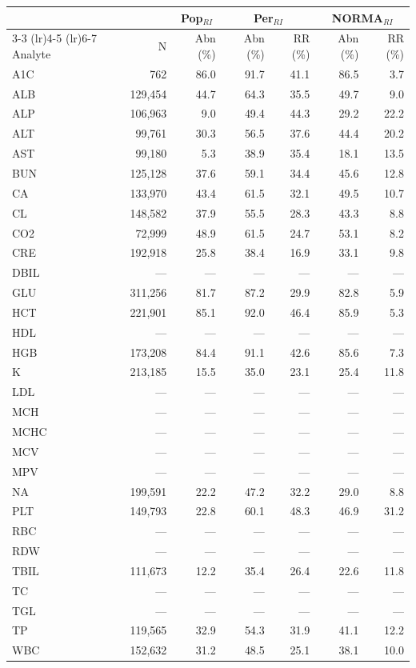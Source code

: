 \begin{table}[ht]
\centering
\footnotesize
\begin{tabular}{lrrrrrr}
\toprule
 & & \multicolumn{1}{c}{Pop$_{RI}$} & \multicolumn{2}{c}{Per$_{RI}$} & \multicolumn{2}{c}{NORMA$_{RI}$} \\
\cmidrule(lr){3-3} \cmidrule(lr){4-5} \cmidrule(lr){6-7}
Analyte & N & Abn (\%) & Abn (\%) & RR (\%) & Abn (\%) & RR (\%) \\
\midrule
A1C & 762 & 86.0 & 91.7 & 41.1 & 86.5 & 3.7 \\
ALB & 129,454 & 44.7 & 64.3 & 35.5 & 49.7 & 9.0 \\
ALP & 106,963 & 9.0 & 49.4 & 44.3 & 29.2 & 22.2 \\
ALT & 99,761 & 30.3 & 56.5 & 37.6 & 44.4 & 20.2 \\
AST & 99,180 & 5.3 & 38.9 & 35.4 & 18.1 & 13.5 \\
BUN & 125,128 & 37.6 & 59.1 & 34.4 & 45.6 & 12.8 \\
CA & 133,970 & 43.4 & 61.5 & 32.1 & 49.5 & 10.7 \\
CL & 148,582 & 37.9 & 55.5 & 28.3 & 43.3 & 8.8 \\
CO2 & 72,999 & 48.9 & 61.5 & 24.7 & 53.1 & 8.2 \\
CRE & 192,918 & 25.8 & 38.4 & 16.9 & 33.1 & 9.8 \\
DBIL & --- & --- & --- & --- & --- & --- \\
GLU & 311,256 & 81.7 & 87.2 & 29.9 & 82.8 & 5.9 \\
HCT & 221,901 & 85.1 & 92.0 & 46.4 & 85.9 & 5.3 \\
HDL & --- & --- & --- & --- & --- & --- \\
HGB & 173,208 & 84.4 & 91.1 & 42.6 & 85.6 & 7.3 \\
K & 213,185 & 15.5 & 35.0 & 23.1 & 25.4 & 11.8 \\
LDL & --- & --- & --- & --- & --- & --- \\
MCH & --- & --- & --- & --- & --- & --- \\
MCHC & --- & --- & --- & --- & --- & --- \\
MCV & --- & --- & --- & --- & --- & --- \\
MPV & --- & --- & --- & --- & --- & --- \\
NA & 199,591 & 22.2 & 47.2 & 32.2 & 29.0 & 8.8 \\
PLT & 149,793 & 22.8 & 60.1 & 48.3 & 46.9 & 31.2 \\
RBC & --- & --- & --- & --- & --- & --- \\
RDW & --- & --- & --- & --- & --- & --- \\
TBIL & 111,673 & 12.2 & 35.4 & 26.4 & 22.6 & 11.8 \\
TC & --- & --- & --- & --- & --- & --- \\
TGL & --- & --- & --- & --- & --- & --- \\
TP & 119,565 & 32.9 & 54.3 & 31.9 & 41.1 & 12.2 \\
WBC & 152,632 & 31.2 & 48.5 & 25.1 & 38.1 & 10.0 \\
\bottomrule
\end{tabular}
\label{tab:07_prevalence_detail_inspire}
\end{table}